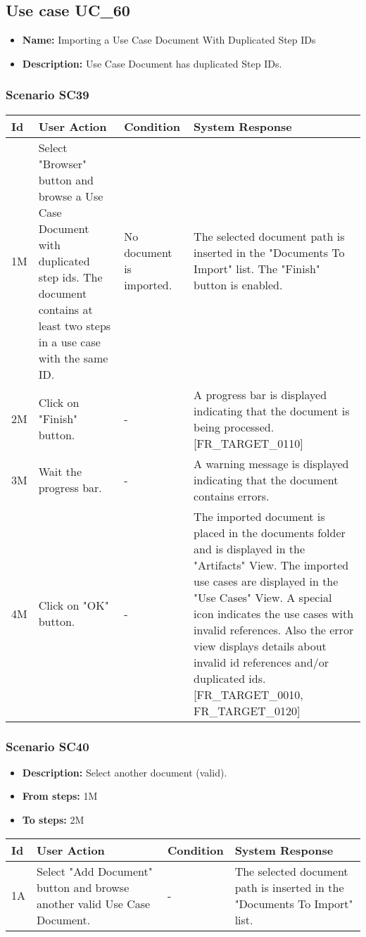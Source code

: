 \documentclass[a4paper,11pt]{article}
\newcommand{\bl}{\\ \hline}
\begin{document}
\subsection*{Use case UC_60}
\begin{itemize}
\item {\bf Name: }Importing a Use Case Document With Duplicated Step IDs
\item {\bf Description: }Use Case Document has duplicated Step IDs.
\end{itemize}
\subsubsection*{Scenario SC39}
\begin{tabular}{|p{0.4in}|p{1.5in}|p{1.5in}|p{1.5in}|}
\hline
Id & User Action & Condition & System Response \bl 
1M & Select "Browser" button and browse a Use Case Document with
						duplicated step ids. The document contains at least two steps in a
						use case with the same ID.  & No document is imported. & The selected document path is inserted in the "Documents
						To Import" list. The "Finish" button is enabled.\bl
2M & Click on "Finish" button. & - & A progress bar is displayed indicating that the document
						is being processed. [FR_TARGET_0110]\bl
3M & Wait the progress bar. & - & A warning message is displayed indicating that the
						document contains errors.\bl
4M & Click on "OK" button. & - & The imported document is placed in the documents folder
						and is displayed in the "Artifacts" View. The imported use cases
						are displayed in the "Use Cases" View. A special icon indicates
						the use cases with invalid references. Also the error view
						displays details about invalid id references and/or duplicated
						ids. [FR_TARGET_0010, FR_TARGET_0120]\bl
\end{tabular}
\subsubsection*{Scenario SC40}
\begin{itemize}
\item {\bf Description:} Select another document (valid).
\item {\bf From steps:} 1M
\item {\bf To steps:} 2M
\end{itemize}
\begin{tabular}{|p{0.4in}|p{1.5in}|p{1.5in}|p{1.5in}|}
\hline
Id & User Action & Condition & System Response \bl 
1A & Select "Add Document" button and browse another valid Use
						Case Document.  & - & The selected document path is inserted in the "Documents
						To Import" list.\bl
\end{tabular}
\end{document}
